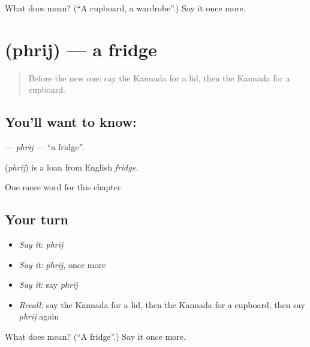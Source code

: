 \begin{tcolorbox}[breakable,colback=teal!4,colframe=teal!35!black,title={Before you move on}]
What does  mean? (\textquotedblleft{}A cupboard, a wardrobe\textquotedblright{}.) Say it once more.
\end{tcolorbox}
\section[\texorpdfstring{\kn{ಫ್ರಿಜ್} (phrij)}{ಫ್ರಿಜ್ (phrij)}]{ (phrij) — a fridge}

\label{lesson:KA-C220-phrij}



\begin{quote}
Before the new one: say the Kannada for a lid, then the Kannada for a cupboard.
\end{quote}

\subsection*{You'll want to know: }
\textbf{} — \emph{phrij} — \textquotedblleft{}a fridge\textquotedblright{}.

\begin{cousinweb}
\textbf{} (\emph{phrij}) is a loan from English \emph{fridge}.
\end{cousinweb}

\begin{grammarlens}[title={What you've built}]
One more word for this chapter.
\end{grammarlens}

\subsection*{Your turn}
\begin{itemize}
\raggedright
  \item \emph{Say it:} \emph{phrij}
  \item \emph{Say it:} \emph{phrij}, once more
  \item \emph{Say it:} say \emph{phrij}
  \item \emph{Recall:} say the Kannada for a lid, then the Kannada for a cupboard, then say \emph{phrij} again
\end{itemize}

\begin{tcolorbox}[breakable,colback=teal!4,colframe=teal!35!black,title={Before you move on}]
What does  mean? (\textquotedblleft{}A fridge\textquotedblright{}.) Say it once more.
\end{tcolorbox}
